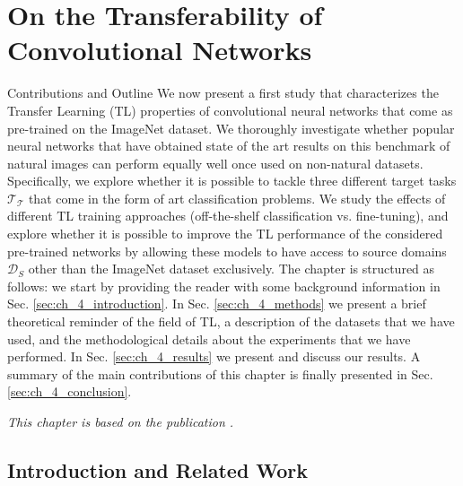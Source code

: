 \chapter{On the Transferability of Convolutional Networks}
\label{ch:tl_natural_to_non_natural}

\begin{remark}{Contributions and Outline} 
	We now present a first study that characterizes the Transfer Learning (TL) properties of convolutional neural networks that come as pre-trained on the ImageNet dataset. We thoroughly investigate whether popular neural networks that have obtained state of the art results on this benchmark of natural images can perform equally well once used on non-natural datasets. Specifically, we explore whether it is possible to tackle three different target tasks $\mathcal{T_T}$ that come in the form of art classification problems. We study the effects of different TL training approaches (off-the-shelf classification vs. fine-tuning), and explore whether it is possible to improve the TL performance of the considered pre-trained networks by allowing these models to have access to source domains $\mathcal{D}_S$ other than the ImageNet dataset exclusively. The chapter is structured as follows: we start by providing the reader with some background information in Sec. \ref{sec:ch_4_introduction}. In Sec. \ref{sec:ch_4_methods} we present a brief theoretical reminder of the field of TL, a description of the datasets that we have used, and the methodological details about the experiments that we have performed. In Sec. \ref{sec:ch_4_results} we present and discuss our results. A summary of the main contributions of this chapter is finally presented in Sec. \ref{sec:ch_4_conclusion}.

\vspace{5mm}
\textit{This chapter is based on the publication \citet{sabatelli2018deep}.}
\end{remark}



\iffalse
\section{Introduction and Related Work}
\label{sec:introduction}


